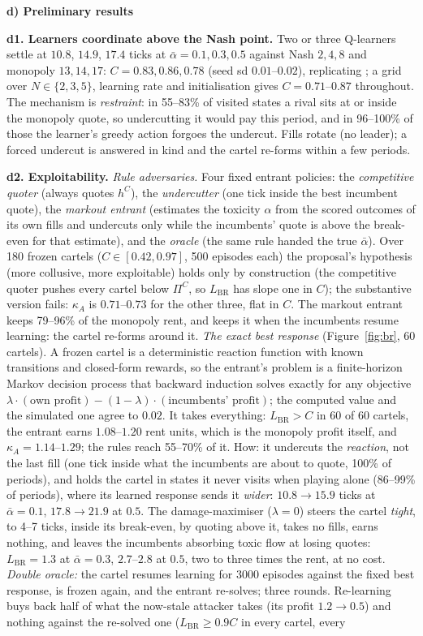 \documentclass[10pt]{article}
\newcommand{\LBR}{L_{\mathrm{BR}}}
\newcommand{\sect}[1]{\par\vspace{5pt}\noindent\textbf{#1}\par\vspace{1.5pt}\noindent}
\begin{document}
\sect{d) Preliminary results}
\textbf{d1. Learners coordinate above the Nash point.} Two or three Q-learners settle at $10.8$, $14.9$, $17.4$ ticks at $\bar\alpha=0.1,0.3,0.5$ against Nash $2,4,8$ and monopoly $13,14,17$: $C=0.83,0.86,0.78$ (seed sd $0.01$--$0.02$), replicating \cite{cfl}; a grid over $N\in\{2,3,5\}$, learning rate and initialisation gives $C=0.71$--$0.87$ throughout. The mechanism is \emph{restraint}: in 55--83\% of visited states a rival sits at or inside the monopoly quote, so undercutting it would pay this period, and in 96--100\% of those the learner's greedy action forgoes the undercut. Fills rotate (no leader); a forced undercut is answered in kind and the cartel re-forms within a few periods.

\textbf{d2. Exploitability.} \emph{Rule adversaries.} Four fixed entrant policies: the \emph{competitive quoter} (always quotes $h^C$), the \emph{undercutter} (one tick inside the best incumbent quote), the \emph{markout entrant} (estimates the toxicity $\alpha$ from the scored outcomes of its own fills and undercuts only while the incumbents' quote is above the break-even for that estimate), and the \emph{oracle} (the same rule handed the true $\bar\alpha$). Over 180 frozen cartels ($C\in[0.42,0.97]$, 500 episodes each) the proposal's hypothesis (more collusive, more exploitable) holds only by construction (the competitive quoter pushes every cartel below $\Pi^C$, so $\LBR$ has slope one in $C$); the substantive version fails: $\kappa_A$ is $0.71$--$0.73$ for the other three, flat in $C$. The markout entrant keeps 79--96\% of the monopoly rent, and keeps it when the incumbents resume learning: the cartel re-forms around it. \emph{The exact best response} (Figure~\ref{fig:br}, 60 cartels). A frozen cartel is a deterministic reaction function with known transitions and closed-form rewards, so the entrant's problem is a finite-horizon Markov decision process that backward induction solves exactly for any objective $\lambda\cdot(\text{own profit})-(1-\lambda)\cdot(\text{incumbents' profit})$; the computed value and the simulated one agree to $0.02$. It takes everything: $\LBR>C$ in 60 of 60 cartels, the entrant earns $1.08$--$1.20$ rent units, which is the monopoly profit itself, and $\kappa_A=1.14$--$1.29$; the rules reach 55--70\% of it. How: it undercuts the \emph{reaction}, not the last fill (one tick inside what the incumbents are about to quote, 100\% of periods), and holds the cartel in states it never visits when playing alone (86--99\% of periods), where its learned response sends it \emph{wider}: $10.8\to15.9$ ticks at $\bar\alpha=0.1$, $17.8\to21.9$ at $0.5$. The damage-maximiser ($\lambda=0$) steers the cartel \emph{tight}, to 4--7 ticks, inside its break-even, by quoting above it, takes no fills, earns nothing, and leaves the incumbents absorbing toxic flow at losing quotes: $\LBR=1.3$ at $\bar\alpha=0.3$, $2.7$--$2.8$ at $0.5$, two to three times the rent, at no cost. \emph{Double oracle:} the cartel resumes learning for 3000 episodes against the fixed best response, is frozen again, and the entrant re-solves; three rounds. Re-learning buys back half of what the now-stale attacker takes (its profit $1.2\to0.5$) and nothing against the re-solved one ($\LBR\ge0.9C$ in every cartel, every 
\end{document}
